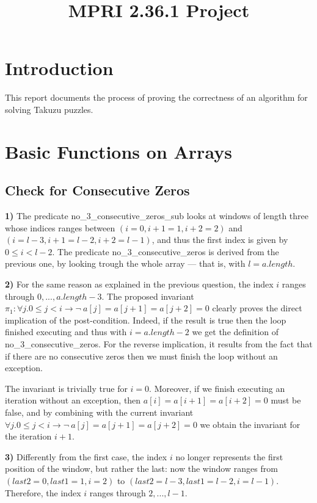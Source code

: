 \documentclass[]{StandardTemplate}
\title{MPRI 2.36.1 Project}
\begin{document}
\maketitle

\section{Introduction}
\label{sec:intro}



This report documents the process of proving the correctness of an algorithm for solving Takuzu puzzles.

\section{Basic Functions on Arrays}
\label{sec:arrays}

\subsection{Check for Consecutive Zeros}
\label{subsec:zeros}

\textbf{1)} The predicate no\_3\_consecutive\_zeros\_sub looks at windows of length three whose indices ranges between $ (i=0,i+1=1,i+2=2) $ and $ (i=l-3,i+1=l-2,i+2=l-1) $, and thus the first index is given by $ 0 \leq i < l-2 $. The predicate no\_3\_consecutive\_zeros is derived from the previous one, by looking trough the whole array --- that is, with $ l = a.length $.

\textbf{2)} For the same reason as explained in the previous question, the index $ i $ ranges through $ 0,...,a.length-3 $. The proposed invariant $\pi_1 : \forall j. 0 \leq j < i \to \neg~ a[j]=a[j+1]=a[j+2]=0 $ clearly proves the direct implication of the post-condition. Indeed, if the result is true then the loop finished executing and thus with $ i = a.length - 2 $ we get the definition of no\_3\_consecutive\_zeros. For the reverse implication, it results from the fact that if there are no consecutive zeros then we must finish the loop without an exception. 

The invariant is trivially true for $ i=0 $. Moreover, if we finish executing an iteration without an exception, then $a[i]=a[i+1]=a[i+2]=0$ must be false, and by combining with the current invariant $ \forall j. 0 \leq j < i \to \neg~ a[j]=a[j+1]=a[j+2]=0 $ we obtain the invariant for the iteration $ i+1 $.

\textbf{3)} Differently from the first case, the index $ i $ no longer represents the first position of the window, but rather the last: now the window ranges from $ (last2 = 0, last1 = 1, i = 2) $ to $ (last2  = l-3, last1  = l-2, i = l-1) $. Therefore, the index $ i $ ranges through $ 2,...,l-1 $.
\end{document}
